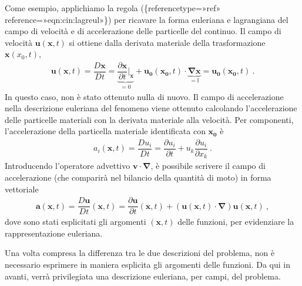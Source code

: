 \documentclass[letterpaper,10pt,italian]{jupyterBook}
\begin{document}
\sphinxAtStartPar
Come esempio, applichiamo la regola
(\{reference\sphinxhyphen{}type=»ref»
reference=»eqn:cin:lagr\sphinxhyphen{}eul»\}) per ricavare la forma euleriana e
lagrangiana del campo di velocità e di accelerazione delle particelle
del continuo. Il campo di velocità \(\mathbf{u}(\mathbf{x},t)\) si ottiene dalla
derivata materiale della trasformazione \(\mathbf{x}(x_0,t)\),
\begin{equation*}
\begin{split}\mathbf{u}(\mathbf{x},t) = \dfrac{D \mathbf{x}}{D t} = \underbrace{\dfrac{\partial \mathbf{x}}{\partial t}\bigg|_{\mathbf{x}} }_{=0} + \mathbf{u_0}(\mathbf{x_0},t) \cdot \underbrace{ \mathbf{\nabla} \mathbf{x} }_{=\mathbb{I}} =
 \mathbf{u_0}(\mathbf{x_0},t) \ .\end{split}
\end{equation*}
\sphinxAtStartPar
In questo caso, non è stato ottenuto nulla
di nuovo. Il campo di accelerazione nella descrizione euleriana del
fenomeno viene ottenuto calcolando l’accelerazione delle particelle
materiali con la derivata materiale alla velocità. Per componenti,
l’accelerazione della particella materiale identificata con \(\mathbf{x_0}\) è
\begin{equation*}
\begin{split}a_{i}(\mathbf{x},t) = \dfrac{D u_{i}}{D t} = 
 \dfrac{\partial u_i}{\partial t} + u_{k} \dfrac{\partial u_i}{\partial x_k} \ .\end{split}
\end{equation*}
\sphinxAtStartPar
Introducendo l’operatore advettivo \(\mathbf{v}\cdot \mathbf{\nabla}\), è
possibile scrivere il campo di accelerazione (che comparirà nel bilancio
della quantità di moto) in forma vettoriale
\begin{equation*}
\begin{split}\mathbf{a}(\mathbf{x},t) = \dfrac{D \mathbf{u}}{D t}(\mathbf{x},t) = \dfrac{\partial \mathbf{u}}{\partial t}(\mathbf{x},t) + (\mathbf{u}(\mathbf{x},t) \cdot \mathbf{\nabla}) \mathbf{u}(\mathbf{x},t) \ ,\end{split}
\end{equation*}
\sphinxAtStartPar
dove sono stati esplicitati gli argomenti \((\mathbf{x},t)\) delle funzioni,
per evidenziare la rappresentazione euleriana.

\sphinxAtStartPar
Una volta compresa la differenza tra le due descrizioni del problema,
non è necessario esprimere in maniera esplicita gli argomenti delle
funzioni. Da qui in avanti, verrà privilegiata una descrizione
euleriana, per campi, del problema.
\end{document}
